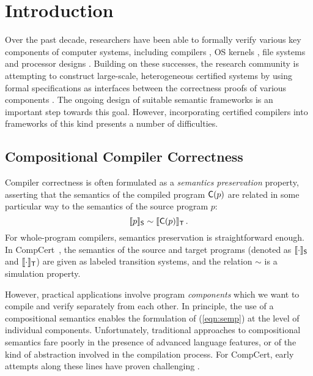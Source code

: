 \section{Introduction}
\label{sec:intro}

Over the past decade, researchers have been able to formally verify
various key components of computer systems, including compilers
\cite{compcert,cakeml,vellvm}, OS kernels \cite{sel4,popl15,osdi16},
file systems \cite{fscq} and processor designs \cite{safe,kami}.
Building on these successes, the research community is attempting to
construct large-scale, heterogeneous certified systems by using formal
specifications as interfaces between the correctness proofs of various
components \cite{deepspec}.  The ongoing design of suitable semantic
frameworks is an important step towards this goal.  However,
incorporating certified compilers into frameworks of this kind
presents a number of difficulties.

\subsection{Compositional Compiler Correctness}
\label{ssec:intro-ccc}

Compiler correctness is often formulated as a \emph{semantics
preservation} property, asserting that the semantics of the compiled
program $ \mathsf{C} (p)$ are related in some particular way to the
semantics of the source program $p$:
\begin{equation} \label{eqn:semp}
  \llbracket p \rrbracket_{ \mathsf{S} } \sim
  \llbracket  \mathsf{C} (p) \rrbracket_{ \mathsf{T} }
  \,.
\end{equation}
For whole-program compilers, semantics preservation is straightforward
enough.  In CompCert~\cite{compcert}, the semantics of the source and
target programs (denoted as $\llbracket \cdot \rrbracket_{ \mathsf{S} }$
and $\llbracket \cdot \rrbracket_{ \mathsf{T} }$)
are given as labeled transition systems, and the
relation $\sim$ is a simulation property.

However, practical applications involve program \emph{components}
which we want to compile and verify separately from each other.  In
principle, the use of a compositional semantics enables the
formulation of (\ref{eqn:semp}) at the level of individual components.
Unfortunately, traditional approaches to compositional semantics fare
poorly in the presence of advanced language features, or of the kind
of abstraction involved in the compilation process.  For CompCert,
early attempts along these lines have proven challenging
\cite{cpp15,compcompcert}.

